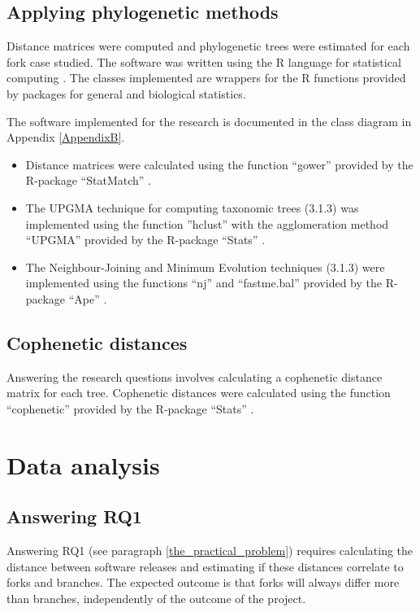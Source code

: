 

\subsection{Applying phylogenetic methods}
Distance matrices were computed and phylogenetic trees were estimated for each fork case studied. The software was written using the R language for statistical computing \citep{RDevelopmentCoreTeam2008a}. The classes implemented are wrappers for the R functions provided by packages for general and biological statistics. 

The software implemented for the research is documented in the class diagram in Appendix \ref{AppendixB}.

\begin{itemize}
\item{Distance matrices were calculated using the function “gower” provided by the R-package “StatMatch” \citep{DOrazio2016}.}

\item{The UPGMA technique for computing taxonomic trees (3.1.3) was implemented using the function ”hclust” with the agglomeration method “UPGMA” provided by the R-package “Stats” \citep[p.1355]{RDevelopmentCoreTeam2008a}.}

\item{The Neighbour-Joining and Minimum Evolution techniques (3.1.3) were implemented using the functions “nj” and “fastme.bal” provided by the R-package “Ape” \citep{Paradis2004a}.}
\end{itemize}

\subsection{Cophenetic distances}
Answering the research questions involves calculating a cophenetic distance matrix for each tree. Cophenetic distances were calculated using the function “cophenetic” provided by the R-package “Stats” \citep[p.1275]{RDevelopmentCoreTeam2008a}.


\section{Data analysis}

\subsection{Answering RQ1}
Answering RQ1 (see paragraph \ref{the_practical_problem}) requires calculating the distance between software releases and estimating if these distances correlate to forks and branches. The expected outcome is that forks will always differ more than branches, independently of the outcome of the project.

